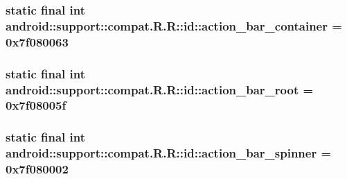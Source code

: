 \hypertarget{classandroid_1_1support_1_1compat_1_1_r_1_1id_265515cbb2241ce283a6c25b2b45cbf0}{
\subsubsection[{action\_\-bar\_\-container}]{\setlength{\rightskip}{0pt plus 5cm}static final int android::support::compat.R.R::id::action\_\-bar\_\-container = 0x7f080063}}
\label{classandroid_1_1support_1_1compat_1_1_r_1_1id_265515cbb2241ce283a6c25b2b45cbf0}


\hypertarget{classandroid_1_1support_1_1compat_1_1_r_1_1id_0cfe5e85c5e66db6cdecb5e79e998825}{
\subsubsection[{action\_\-bar\_\-root}]{\setlength{\rightskip}{0pt plus 5cm}static final int android::support::compat.R.R::id::action\_\-bar\_\-root = 0x7f08005f}}
\label{classandroid_1_1support_1_1compat_1_1_r_1_1id_0cfe5e85c5e66db6cdecb5e79e998825}


\hypertarget{classandroid_1_1support_1_1compat_1_1_r_1_1id_00640bcecedc70fa31c8877fd32aa3bf}{
\subsubsection[{action\_\-bar\_\-spinner}]{\setlength{\rightskip}{0pt plus 5cm}static final int android::support::compat.R.R::id::action\_\-bar\_\-spinner = 0x7f080002}}
\label{classandroid_1_1support_1_1compat_1_1_r_1_1id_00640bcecedc70fa31c8877fd32aa3bf}



